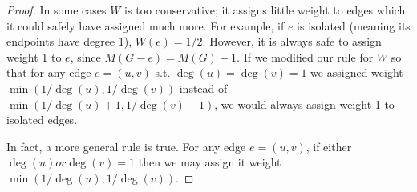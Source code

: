 \begin{proof}

In some cases $W$ is too conservative; it assigns little weight to edges which it could safely have assigned much more.  For example, if $e$ is isolated (meaning its endpoints have degree 1), $W(e) = 1/2$.  However, it is always safe to assign weight 1 to $e$, since $M(G-e) = M(G)-1.$  If we modified our rule for $W$ so that for any edge $e= (u,v)$ s.t. $\deg(u)=\deg(v) = 1$ we assigned weight $ \min(1/\deg(u),1/\deg(v))$ instead of $ \min(1/\deg(u)+1,1/\deg(v)+1)$, we would always assign weight 1 to isolated edges.

In fact, a more general rule is true.  For any edge $e= (u,v)$, if either $\deg(u) or \deg(v) = 1$ then we may assign it weight $\min(1/\deg(u),1/\deg(v))$.

\end{proof}

